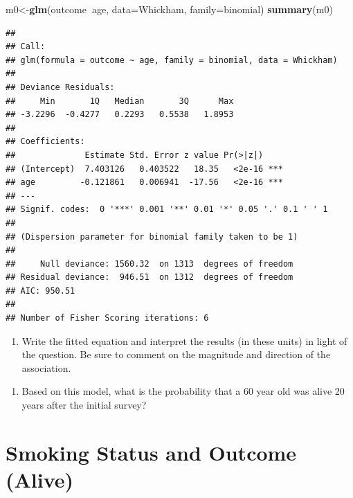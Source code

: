 \documentclass[]{article}
\newenvironment{Shaded}{\begin{snugshade}}{\end{snugshade}}
\newcommand{\DataTypeTok}[1]{\textcolor[rgb]{0.13,0.29,0.53}{#1}}
\newcommand{\KeywordTok}[1]{\textcolor[rgb]{0.13,0.29,0.53}{\textbf{#1}}}
\newcommand{\NormalTok}[1]{#1}
\newcommand{\OperatorTok}[1]{\textcolor[rgb]{0.81,0.36,0.00}{\textbf{#1}}}
\providecommand{\tightlist}{%
  \setlength{\itemsep}{0pt}\setlength{\parskip}{0pt}}
\begin{document}
\begin{Shaded}
\begin{Highlighting}[]
\NormalTok{m0<-}\KeywordTok{glm}\NormalTok{(outcome}\OperatorTok{~}\NormalTok{age, }\DataTypeTok{data=}\NormalTok{Whickham, }\DataTypeTok{family=}\NormalTok{binomial)}
\KeywordTok{summary}\NormalTok{(m0)}
\end{Highlighting}
\end{Shaded}

\begin{verbatim}
## 
## Call:
## glm(formula = outcome ~ age, family = binomial, data = Whickham)
## 
## Deviance Residuals: 
##     Min       1Q   Median       3Q      Max  
## -3.2296  -0.4277   0.2293   0.5538   1.8953  
## 
## Coefficients:
##              Estimate Std. Error z value Pr(>|z|)    
## (Intercept)  7.403126   0.403522   18.35   <2e-16 ***
## age         -0.121861   0.006941  -17.56   <2e-16 ***
## ---
## Signif. codes:  0 '***' 0.001 '**' 0.01 '*' 0.05 '.' 0.1 ' ' 1
## 
## (Dispersion parameter for binomial family taken to be 1)
## 
##     Null deviance: 1560.32  on 1313  degrees of freedom
## Residual deviance:  946.51  on 1312  degrees of freedom
## AIC: 950.51
## 
## Number of Fisher Scoring iterations: 6
\end{verbatim}

\begin{enumerate}
\def\labelenumi{\arabic{enumi}.}
\tightlist
\item
  Write the fitted equation and interpret the results (in these units)
  in light of the question. Be sure to comment on the magnitude and
  direction of the association.
\end{enumerate}

\vspace{1in}

\begin{enumerate}
\def\labelenumi{\arabic{enumi}.}
\setcounter{enumi}{1}
\tightlist
\item
  Based on this model, what is the probability that a 60 year old was
  alive 20 years after the initial survey?
\end{enumerate}

\vspace{2in}

\newpage

\hypertarget{smoking-status-and-outcome-alive}{%
\section{Smoking Status and Outcome
(Alive)}\label{smoking-status-and-outcome-alive}}
\end{document}
